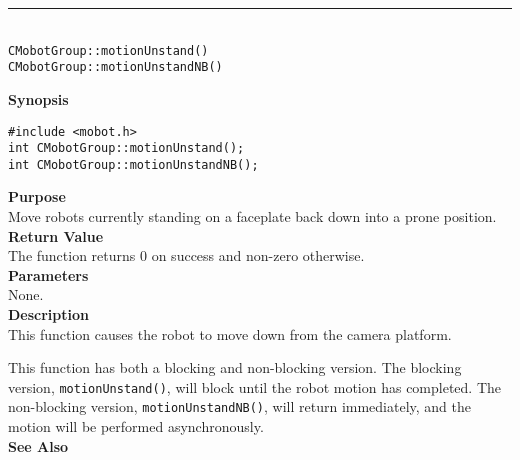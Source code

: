 \noindent
\vspace{5pt}
\rule{4.5in}{0.015in}\\
\noindent
{\LARGE \texttt{CMobotGroup::motionUnstand()}}\\
{\LARGE \texttt{CMobotGroup::motionUnstandNB()}}\\
{}

\noindent
{\bf Synopsis}
\vspace{-8pt}
\begin{verbatim}
#include <mobot.h>
int CMobotGroup::motionUnstand();
int CMobotGroup::motionUnstandNB();
\end{verbatim}

\noindent
{\bf Purpose}\\
Move robots currently standing on a faceplate back down into a prone position.\\

\noindent
{\bf Return Value}\\
The function returns 0 on success and non-zero otherwise.\\

\noindent
{\bf Parameters}\\
None.\\

\noindent
{\bf Description}\\
This function causes the robot to move down from the camera platform.

This function has both a blocking and non-blocking version.
The blocking version, \texttt{motionUnstand()}, will block until the
robot motion has completed. The non-blocking version, \texttt{motionUnstandNB()},
will return immediately, and the motion will be performed asynchronously.\\

\noindent
{\bf See Also}\\

